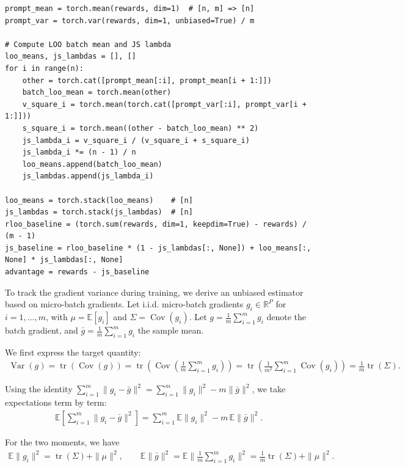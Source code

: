 \documentclass{article}
\makeatletter
\theoremstyle{plain}
\theoremstyle{definition}
\theoremstyle{remark}
\newcommand{\E}{\mathbb{E}}
\DeclareMathOperator{\Var}{Var}
\DeclareMathOperator{\Cov}{Cov}
\DeclareMathOperator{\tr}{tr}
\newlength{\secvspace}
\let\originalsubsection\subsection
\renewcommand{\subsection}{\@ifstar{\@subsectionstar}{\@subsectionnormal}}
\newcommand{\@subsectionnormal}[1]{%
  \vspace{-\secvspace}%
  \originalsubsection{#1}%
  \vspace{-\secvspace}%
}
\newcommand{\@subsectionstar}[1]{%
  \vspace{-\secvspace}%
  \originalsubsection*{#1}%
  \vspace{-\secvspace}%
}
\makeatother
\begin{document}
\begin{lstlisting}[caption={Shrinkage Baseline Advantage Estimator}, label={lst:js-adv}]
prompt_mean = torch.mean(rewards, dim=1)  # [n, m] => [n]
prompt_var = torch.var(rewards, dim=1, unbiased=True) / m

# Compute LOO batch mean and JS lambda
loo_means, js_lambdas = [], []
for i in range(n):
    other = torch.cat([prompt_mean[:i], prompt_mean[i + 1:]])
    batch_loo_mean = torch.mean(other)
    v_square_i = torch.mean(torch.cat([prompt_var[:i], prompt_var[i + 1:]]))
    s_square_i = torch.mean((other - batch_loo_mean) ** 2)
    js_lambda_i = v_square_i / (v_square_i + s_square_i)
    js_lambda_i *= (n - 1) / n
    loo_means.append(batch_loo_mean)
    js_lambdas.append(js_lambda_i)

loo_means = torch.stack(loo_means)    # [n]
js_lambdas = torch.stack(js_lambdas)  # [n]
rloo_baseline = (torch.sum(rewards, dim=1, keepdim=True) - rewards) / (m - 1)
js_baseline = rloo_baseline * (1 - js_lambdas[:, None]) + loo_means[:, None] * js_lambdas[:, None]
advantage = rewards - js_baseline
\end{lstlisting}

\subsection{Variance Recording}
\label{app:variance-recording}

To track the gradient variance during training, we derive an unbiased estimator based on micro-batch gradients. Let i.i.d. micro-batch gradients $g_i\in\mathbb{R}^P$ for $i=1,\dots,m$, with $\mu=\E[g_i]$ and $\Sigma=\Cov(g_i)$. Let $g=\frac{1}{m}\sum_{i=1}^m g_i$ denote the batch gradient, and $\bar g=\frac{1}{m}\sum_{i=1}^m g_i$ the sample mean.

We first express the target quantity:
\begin{align*}
\textstyle \Var(g)
= \tr(\Cov(g))
= \tr(\Cov(\tfrac{1}{m}\sum_{i=1}^m g_i))
= \tr(\tfrac{1}{m^2}\sum_{i=1}^m \Cov(g_i))
= \frac{1}{m}\tr(\Sigma).
\end{align*}

Using the identity $\sum_{i=1}^m \|g_i-\bar g\|^2=\sum_{i=1}^m \|g_i\|^2 - m\|\bar g\|^2$, we take expectations term by term:
\begin{align*}
\textstyle \E[\sum_{i=1}^m \|g_i-\bar g\|^2]
= \sum_{i=1}^m \E\|g_i\|^2 - m\,\E\|\bar g\|^2.
\end{align*}

For the two moments, we have
\begin{align*}
\textstyle \E\|g_i\|^2 = \tr(\Sigma)+\|\mu\|^2, \qquad
\E\|\bar g\|^2
= \E\|\frac{1}{m}\sum_{i=1}^m g_i\|^2
= \frac{1}{m}\tr(\Sigma)+\|\mu\|^2.
\end{align*}
\end{document}
